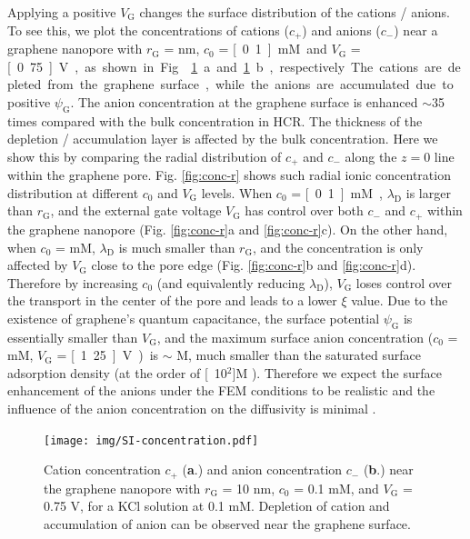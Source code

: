 \documentclass[manuscript=suppinfo,email=true, hyperref=true, keywords=false]{achemso}
\newcommand{\Fig}{Fig.}
\begin{document}
Applying a positive $V_{\mathrm{G}}$ changes the surface distribution
of the cations / anions. To see this, we plot the concentrations of
cations ($c_{+}$) and anions ($c_{-}$) near a graphene nanopore with
$r_{\mathrm{G}}$ = \unit[10]{nm}, $c_{0}$ = \unit[0.1]{mM} and $V_{\mathrm{G}}$ =
\unit[0.75]{V}, as shown in \Fig{} \ref{fig:conc}a and \ref{fig:conc}b,
respectively. The cations are depleted from the graphene surface,
while the anions are accumulated due to positive
$\psi_{\mathrm{G}}$. The anion concentration at the graphene surface
is enhanced $\sim{}$35 times compared with the bulk concentration in
HCR. The thickness of the depletion / accumulation layer is affected
by the bulk concentration. Here we show this by comparing the radial
distribution of $c_{+}$ and $c_{-}$ along the $z = 0$ line within the
graphene pore. \Fig{} \ref{fig:conc-r} shows such radial ionic
concentration distribution at different $c_{0}$ and $V_{\mathrm{G}}$
levels. When $c_{0}$ = \unit[0.1]{mM}, $\lambda_{\mathrm{D}}$ is larger than
$r_{\mathrm{G}}$, and the external gate voltage $V_{\mathrm{G}}$ has
control over both $c_{-}$ and $c_{+}$ within the graphene nanopore
(\Fig{} \ref{fig:conc-r}a and \ref{fig:conc-r}c). On the other
hand, when $c_{0}$ = \unit[100]{mM}, $\lambda_{\mathrm{D}}$ is much smaller
than $r_{\mathrm{G}}$, and the concentration is only affected by
$V_{\mathrm{G}}$ close to the pore edge (\Fig{} \ref{fig:conc-r}b
and \ref{fig:conc-r}d). Therefore by increasing $c_{0}$ (and
equivalently reducing $\lambda_{\mathrm{D}}$), $V_{\mathrm{G}}$ loses
control over the transport in the center of the pore and leads to a
lower $\xi$ value. Due to the existence of graphene's quantum
capacitance, the surface potential $\psi_{\mathrm{G}}$ is essentially
smaller than $V_{\mathrm{G}}$, and the maximum surface anion
concentration ($c_{0}$ = \unit[100]{mM}, $V_{\mathrm{G}}$ = \unit[1.25]{V}) is
$\sim{}$ \unit[3]{M}, much smaller than the saturated surface adsorption
density (at the order of \unit[10$^{2}$]{M}
\cite{bard_electrochemical_1980}). Therefore we expect the surface
enhancement of the anions under the FEM conditions to be realistic and
the influence of the anion concentration on the diffusivity is minimal
\cite{Tang_1999_I}.


\begin{figure}[htbp]
  \centering
  \texttt{[image: img/SI-concentration.pdf]}
  \caption{Cation concentration $c_{+}$ (\textbf{a}.) and anion
    concentration $c_{-}$ (\textbf{b}.) near the graphene nanopore
    with $r_{\mathrm{G}}$ = 10 nm, $c_{0}$ = 0.1 mM, and
    $V_{\mathrm{G}}$ = 0.75 V, for a KCl solution at 0.1
    mM. Depletion of cation and accumulation of anion can be observed
    near the graphene surface.}
  \label{fig:conc}
\end{figure}
\end{document}
